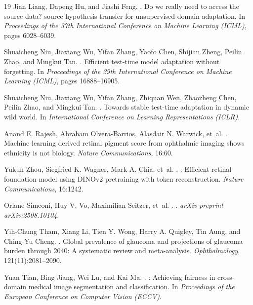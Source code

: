 \documentclass[11pt]{article}
\begin{document}
\begin{thebibliography}{19}
Jian Liang, Dapeng Hu, and Jiashi Feng.
.
\newblock Do we really need to access the source data? source hypothesis
  transfer for unsupervised domain adaptation.
\newblock In \textit{Proceedings of the 37th International Conference on
  Machine Learning (ICML)}, pages 6028--6039.

Shuaicheng Niu, Jiaxiang Wu, Yifan Zhang, Yaofo Chen, Shijian Zheng,
  Peilin Zhao, and Mingkui Tan.
.
\newblock Efficient test-time model adaptation without forgetting.
\newblock In \textit{Proceedings of the 39th International Conference on
  Machine Learning (ICML)}, pages 16888--16905.

Shuaicheng Niu, Jiaxiang Wu, Yifan Zhang, Zhiquan Wen, Zhaozheng Chen,
  Peilin Zhao, and Mingkui Tan.
.
\newblock Towards stable test-time adaptation in dynamic wild world.
\newblock In \textit{International Conference on Learning Representations
  (ICLR)}.

Anand E. Rajesh, Abraham Olvera-Barrios, Alasdair N. Warwick, et~al.
.
\newblock Machine learning derived retinal pigment score from ophthalmic
  imaging shows ethnicity is not biology.
\newblock \textit{Nature Communications}, 16:60.

Yukun Zhou, Siegfried K. Wagner, Mark A. Chia, et~al.
.
: Efficient retinal foundation model using {DINOv2}
  pretraining with token reconstruction.
\newblock \textit{Nature Communications}, 16:1242.

Oriane Simeoni, Huy V. Vo, Maximilian Seitzer, et~al.
.
.
\newblock \textit{arXiv preprint arXiv:2508.10104}.

Yih-Chung Tham, Xiang Li, Tien Y. Wong, Harry A. Quigley, Tin Aung, and
  Ching-Yu Cheng.
.
\newblock Global prevalence of glaucoma and projections of glaucoma burden
  through 2040: A systematic review and meta-analysis.
\newblock \textit{Ophthalmology}, 121(11):2081--2090.

Yuan Tian, Bing Jiang, Wei Lu, and Kai Ma.
.
: Achieving fairness in cross-domain medical image
  segmentation and classification.
\newblock In \textit{Proceedings of the European Conference on Computer Vision
  (ECCV)}.


\end{thebibliography}
\end{document}
